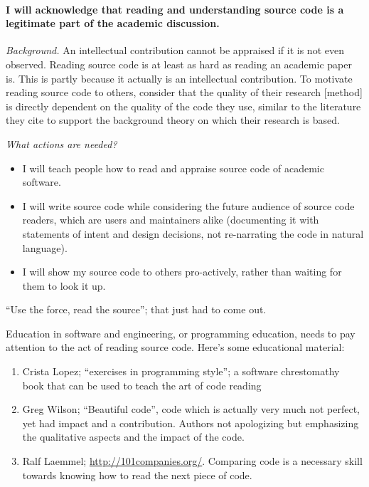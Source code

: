 



\paragraph{I will acknowledge that reading and understanding source code is a legitimate part of the academic discussion.}

\emph{Background.}
An intellectual contribution cannot be appraised if it is not even observed. Reading source code is at least as hard as reading an academic paper is. This is partly because it actually is an intellectual contribution. To motivate reading source code to others, consider that the quality of their research [method] is directly dependent on the quality of the code they use, similar to the literature they cite to support the background theory on which their research is based. 

\emph{What actions are needed?}
\begin{itemize}
\item I will teach people how to read and appraise source code of academic software.
\item I will write source code while considering the future audience of source code readers, which are users and maintainers alike (documenting it with statements of intent and design decisions, not re-narrating the code in natural language).
\item I will show my source code to others pro-actively, rather than waiting for them to look it up.
\end{itemize}

``Use the force, read the source''; that just had to come out.

Education in software and engineering, or programming education, needs to pay attention to the act of reading source code. Here's some educational material:
\begin{enumerate}
\item Crista Lopez; ``exercises in programming style''; a software chrestomathy book that can be used to teach the art of code reading
\item Greg Wilson; ``Beautiful code'', code which is actually very much not perfect, yet had impact and a contribution. Authors not apologizing but emphasizing the qualitative aspects and the impact of the code.
\item Ralf Laemmel; \url{http://101companies.org/}. Comparing code is a necessary skill towards knowing how to read the next piece of code.
\end{enumerate}


